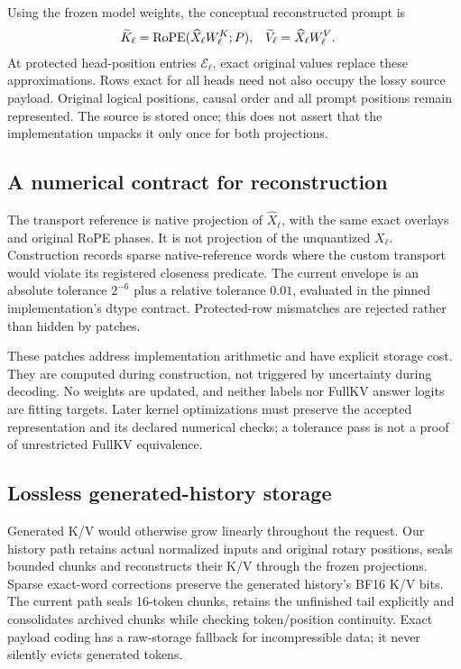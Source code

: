 Using the frozen model weights, the conceptual reconstructed prompt is
\begin{align}
 \widetilde K_\ell &= \operatorname{RoPE}(\widehat X_\ell W^K_\ell;P), &
 \widetilde V_\ell &= \widehat X_\ell W^V_\ell. \label{eq:reconstruct}
\end{align}
At protected head-position entries $\mathcal E_\ell$, exact original values
replace these approximations. Rows exact for all heads need not also occupy
the lossy source payload. Original logical positions, causal order and all
prompt positions remain represented. The source is stored once; this does
not assert that the implementation unpacks it only once for both projections.

\subsection{A numerical contract for reconstruction}
\label{sec:numerics}
The transport reference is native projection of $\widehat X_\ell$, with the
same exact overlays and original RoPE phases. It is not projection of the
unquantized $X_\ell$. Construction records sparse native-reference words
where the custom transport would violate its registered closeness predicate.
The current envelope is an absolute tolerance $2^{-6}$ plus a relative
tolerance $0.01$, evaluated in the pinned implementation's dtype contract.
Protected-row mismatches are rejected rather than hidden by patches.

These patches address implementation arithmetic and have explicit storage
cost. They are computed during construction, not triggered by uncertainty
during decoding. No weights are updated, and neither labels nor FullKV
answer logits are fitting targets. Later kernel optimizations must preserve
the accepted representation and its declared numerical checks; a tolerance
pass is not a proof of unrestricted FullKV equivalence.

\subsection{Lossless generated-history storage}
\label{sec:history}
Generated K/V would otherwise grow linearly throughout the request.
Our history path retains actual normalized inputs and original rotary
positions, seals bounded chunks and reconstructs their K/V through the
frozen projections. Sparse exact-word corrections preserve the generated
history's BF16 K/V bits. The current path seals 16-token chunks, retains
the unfinished tail explicitly and consolidates archived chunks while
checking token/position continuity. Exact payload coding has a raw-storage
fallback for incompressible data; it never silently evicts generated tokens.

